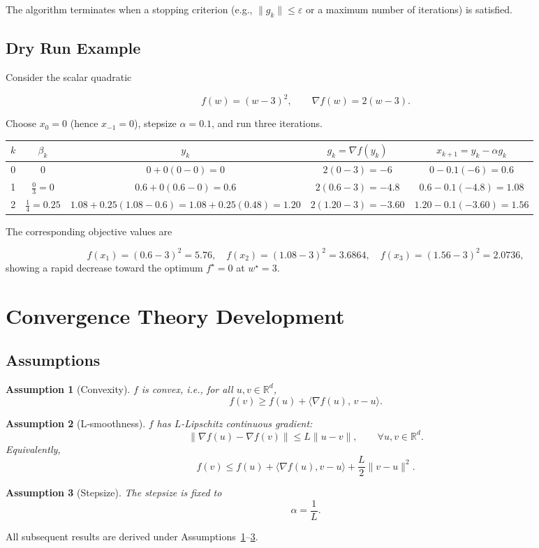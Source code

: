 \documentclass{article}
\newtheorem{assumption}{Assumption}
\begin{document}
The algorithm terminates when a stopping criterion (e.g., \(\|g_k\|\le\varepsilon\) or a maximum number of iterations) is satisfied.

\subsection*{Dry Run Example}
Consider the scalar quadratic  

\[
f(w) = (w-3)^2,\qquad \nabla f(w)=2(w-3).
\]

Choose \(x_0=0\) (hence \(x_{-1}=0\)), stepsize \(\alpha=0.1\), and run three iterations.

\begin{center}
\begin{tabular}{c|c|c|c|c}
\(k\) & \(\beta_k\) & \(y_k\) & \(g_k=\nabla f(y_k)\) & \(x_{k+1}=y_k-\alpha g_k\)\\ \hline
0 & 0 & \(0+0(0-0)=0\) & \(2(0-3)=-6\) & \(0-0.1(-6)=0.6\)\\[4pt]
1 & \(\frac{0}{3}=0\) & \(0.6+0(0.6-0)=0.6\) & \(2(0.6-3)=-4.8\) & \(0.6-0.1(-4.8)=1.08\)\\[4pt]
2 & \(\frac{1}{4}=0.25\) & \(1.08+0.25(1.08-0.6)=1.08+0.25(0.48)=1.20\) &
\(2(1.20-3)=-3.60\) & \(1.20-0.1(-3.60)=1.56\)\\
\end{tabular}
\end{center}

The corresponding objective values are  

\[
f(x_1)= (0.6-3)^2=5.76,\quad
f(x_2)= (1.08-3)^2=3.6864,\quad
f(x_3)= (1.56-3)^2=2.0736,
\]
showing a rapid decrease toward the optimum \(f^\star=0\) at \(w^\star=3\).

\section*{Convergence Theory Development}

\subsection*{Assumptions}
\begin{assumption}[Convexity]\label{as:convex}
\(f\) is convex, i.e., for all \(u,v\in\mathbb{R}^d\),
\[
f(v)\ge f(u)+\langle \nabla f(u),\,v-u\rangle .
\]
\end{assumption}
\begin{assumption}[L‑smoothness]\label{as:smooth}
\(f\) has \(L\)-Lipschitz continuous gradient:
\[
\|\nabla f(u)-\nabla f(v)\|\le L\|u-v\|,\qquad\forall u,v\in\mathbb{R}^d .
\]
Equivalently,
\[
f(v)\le f(u)+\langle \nabla f(u),v-u\rangle+\frac{L}{2}\|v-u\|^2 .
\tag{2}
\]
\end{assumption}
\begin{assumption}[Stepsize]\label{as:stepsize}
The stepsize is fixed to
\[
\alpha = \frac{1}{L}.
\]
\end{assumption}
All subsequent results are derived under Assumptions~\ref{as:convex}–\ref{as:stepsize}.
\end{document}
